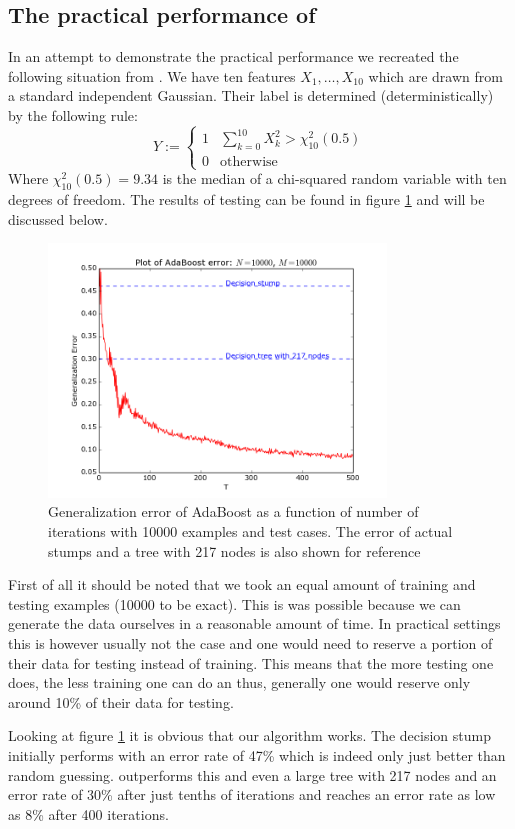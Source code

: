 \subsection{The practical performance of \adaB}
\label{subsec:pracPerf}
In an attempt to demonstrate the practical performance we recreated the following situation from \cite{Hastie2009}. We have ten features $X_1,\ldots,X_{10}$ which are drawn from a standard independent Gaussian. Their label is determined (deterministically) by the following rule: $$Y:=\begin{cases}
1 & \sum_{k=0}^{10} X^2_k > \chi_{10}^2(0.5)\\
0 & \text{otherwise}
\end{cases}$$ Where $\chi_{10}^2(0.5)=9.34$ is the median of a chi-squared random variable with ten degrees of freedom. The results of testing can be found in figure \ref{fig:adaB} and will be discussed below. 

\begin{figure}[!ht]
  \centering
      \includegraphics[width=0.8\textwidth]{generated/longCorrect.png}
  \caption{Generalization error of AdaBoost as a function of number of iterations with 10000 examples and test cases. The error of actual stumps and a tree with 217 nodes is also shown for reference}
      \label{fig:adaB}
\end{figure}

First of all it should be noted that we took an equal amount of training and testing examples (10000 to be exact). This is was possible because we can generate the data ourselves in a reasonable amount of time. In practical settings this is however usually not the case and one would need to reserve a portion of their data for testing instead of training. This means that the more testing one does, the less training one can do an thus, generally one would reserve only around 10\% of their data for testing.

\par Looking at figure \ref{fig:adaB} it is obvious that our algorithm works. The decision stump initially performs with an error rate of 47\% which is indeed only just better than random guessing. \adaB outperforms this and even a large tree with 217 nodes and an error rate of 30\% after just tenths of iterations and reaches an error rate as low as 8\% after 400 iterations.   
